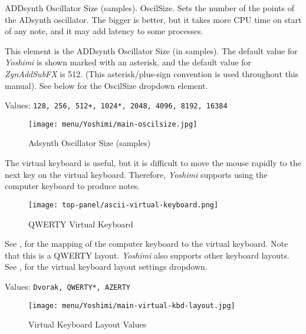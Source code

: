    \setcounter{ItemCounter}{0}      %

   ADDsynth Oscillator Size (samples).
   OscilSize. Sets the number of the points of the ADsynth oscillator. The
   bigger is better, but it takes more CPU time on start of any note, and it
   may add latency to some processes.

   This element is the ADDsynth Oscillator Size (in samples).
   The default value for \textsl{Yoshimi} is shown marked with an asterisk,
   and the default value for \textsl{ZynAddSubFX} is 512.
   (This asterisk/plus-sign convention is used throughout this manual).
   See  below for the OscilSize
   dropdown element.

   Values: \texttt{128, 256, 512+, 1024*, 2048, 4096, 8192, 16384}

\begin{figure}[H]
   \centering 
   \texttt{[image: menu/Yoshimi/main-oscilsize.jpg]}
   \caption[OscilSize Values]{Adsynth Oscillator Size (samples)}
   \label{fig:yoshimi_oscilsize_values}
\end{figure}

   The virtual keyboard is useful, but it is difficult to move the mouse
   rapidly to the next key on the virtual keyboard.
   Therefore, \textsl{Yoshimi} supports using the computer keyboard
   to produce notes.

\begin{figure}[H]
   \centering 
   \texttt{[image: top-panel/ascii-virtual-keyboard.png]}
   \caption{QWERTY Virtual Keyboard}
   \label{fig:qwerty_virtual_keyboard}
\end{figure}

   See ,
   for the mapping of the computer keyboard to the
   virtual keyboard.  Note that this is a QWERTY layout.  
   \textsl{Yoshimi} also supports other keyboard layouts.
   See ,
   for the virtual keyboard
   layout settings dropdown.

   Values: \texttt{Dvorak, QWERTY*, AZERTY}

\begin{figure}[H]
   \centering 
   \texttt{[image: menu/Yoshimi/main-virtual-kbd-layout.jpg]}
   \caption[Virtual Keyboard Layout]{Virtual Keyboard Layout Values}
   \label{fig:virtual_kbd_layout} 
\end{figure}

